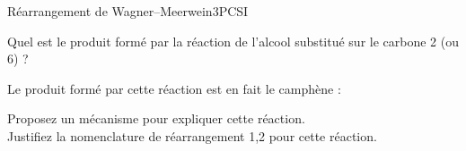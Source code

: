 \begin{exercise}{Réarrangement de Wagner--Meerwein}{3}{PCSI}
\begin{questions}

\question Quel est le produit formé par la réaction de l'alcool substitué sur le carbone 2 (ou 6) ?

\begin{EnvUplevel}
Le produit formé par cette réaction est en fait le camphène :
    \begin{center}
    \end{center}
\end{EnvUplevel}
    \question Proposez un mécanisme pour expliquer cette réaction.\\
    Justifiez la nomenclature de réarrangement 1,2 pour cette réaction.
\end{questions}

\end{exercise}

